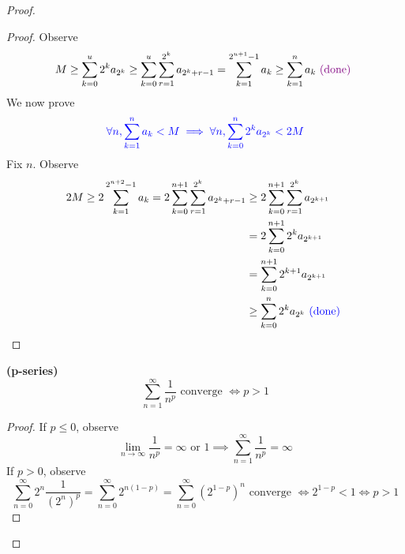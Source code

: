 \documentclass{report}
\begin{document}
\begin{proof}
\begin{proof}
Observe
\begin{equation}
M\geq \sum_{k=0}^u 2^k a_{2^k}\geq \sum_{k=0}^u \sum_{r=1}^{2^k} a_{2^{k}+r-1}=\sum_{k=1}^{2^{u+1}-1} a_k\geq \sum_{k=1}^n a_k\textcolor{violet}{\text{ (done) }}
\end{equation}
We now prove
\begin{equation}
  \textcolor{blue}{\forall n,\sum_{k=1}^n a_k<M\implies \forall n, \sum_{k=0}^n 2^ka_{2^k}<2M}
\end{equation}
Fix $n$. Observe
\begin{align}
  2M\geq 2\sum_{k=1}^{2^{n+2}-1} a_k=2\sum_{k=0}^{n+1}\sum_{r=1}^{2^k}a_{2^k+r-1}&\geq 2\sum_{k=0}^{n+1} \sum_{r=1}^{2^k}a_{2^{k+1}}\\
  &=2\sum_{k=0}^{n+1} 2^ka_{2^{k+1}}\\
  &=\sum_{k=0}^{n+1} 2^{k+1}a_{2^{k+1}}\\
  &\geq \sum_{k=0}^n 2^{k}a_{2^k}\textcolor{blue}{\text{ (done) }}
\end{align}
\end{proof}
\begin{corollary}
\label{2.2.12}
\textbf{(p-series)}
\begin{equation}
\sum_{n=1}^\infty \frac{1}{n^p}\text{ converge }\iff  p>1
\end{equation}
\end{corollary}
\begin{proof}
If $p\leq 0$, observe
\begin{equation}
\lim_{n\to\infty}\frac{1}{n^p}=\infty\text{ or }1\implies \sum_{n=1}^\infty \frac{1}{n^p}=\infty
\end{equation}
If $p>0$, observe
 \begin{equation}
\sum_{n=0}^\infty 2^n \frac{1}{(2^n)^p}=\sum_{n=0}^\infty 2^{n(1-p)}=\sum_{n=0}^\infty (2^{1-p})^n\text{ converge }\iff 2^{1-p}<1\iff p>1
\end{equation}
\end{proof}


\end{proof}
\end{document}
